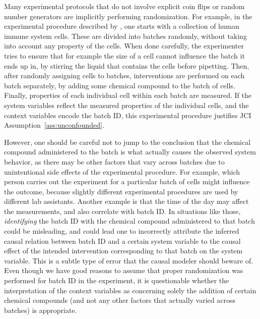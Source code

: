 \documentclass[twoside,11pt]{article}
\begin{document}
Many experimental protocols that do not involve explicit coin flips or random number generators are implicitly performing randomization. For example, in the experimental procedure described by \citet{SPP05}, one starts with a collection of human immune system cells. These are divided into batches randomly, without taking into account any property of the cells. When done carefully, the experimenter tries to ensure that for example the size of a cell cannot influence the batch it ends up in, by stirring the liquid that contains the cells before pipetting. Then, after randomly assigning cells to batches, interventions are performed on each batch separately, by adding some chemical compound to the batch of cells. Finally, properties of each individual cell within each batch are measured. If the system variables reflect the measured properties of the individual cells, and the context variables encode the batch ID, this experimental procedure justifies JCI Assumption~\ref{ass:unconfounded}. 

However, one should be careful not to jump to the conclusion that the chemical compound administered to the batch is what actually causes the observed system behavior, as there may be other factors that vary across batches due to unintentional side effects of the experimental procedure. For example, which person carries out the experiment for a particular batch of cells might influence the outcome, because slightly different experimental procedures are used by different lab assistants. Another example is that the time of the day may affect the measurements, and also correlate with batch ID. In situations like those, \emph{identifying} the batch ID with the chemical compound administered to that batch could be misleading, and could lead one to incorrectly attribute the inferred causal relation between batch ID and a certain system variable to the causal effect of the intended intervention corresponding to that batch on the system variable. This is a subtle type of error that the causal modeler should beware of. Even though we have good reasons to assume that proper randomization was performed for batch ID in the \citet{SPP05} experiment, it is questionable whether the interpretation of the context variables as concerning solely the addition of certain chemical compounds (and not any other factors that actually varied across batches) is appropriate.
\end{document}
